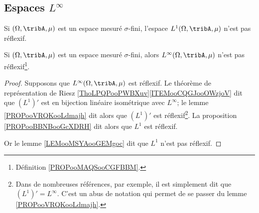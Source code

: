 \subsection{Espaces \texorpdfstring{\(  L^{\infty}\)}{Linfinity}}

\begin{lemma}        \label{LEMooMSYAooGEMgoc}
	Si \( (\Omega,\tribA,\mu)\) est un espace mesuré \( \sigma\)-fini, l'espace \( L^1(\Omega,\tribA,\mu)\) n'est pas réflexif.
\end{lemma}

\begin{lemma}     \label{LEMooUSXTooFvpsVd}
	Si \( (\Omega,\tribA,\mu)\) est un espace mesuré \( \sigma\)-fini, alors \( L^{\infty}(\Omega,\tribA,\mu)\) n'est pas réflexif\footnote{Définition \ref{PROPooMAQSooCGFBBM}.}.
\end{lemma}

\begin{proof}
	Supposons que \( L^{\infty}(\Omega,\tribA,\mu)\) est réflexif. Le théorème de représentation de Riesz \ref{ThoLPQPooPWBXuv}\ref{ITEMooCQGJooOWzjoV} dit que \( (L^1)'\) est en bijection linéaire isométrique avec \( L^{\infty}\); le lemme \ref{PROPooVRQKooLdmajh} dit alors que \( (L^1)'\) est réflexif\footnote{Dans de nombreuses références, par exemple\cite{BIBooFDGQooYferue}, il est simplement dit que \( (L^1)'=L^{\infty}\). C'est un abus de notation qui permet de se passer du lemme \ref{PROPooVRQKooLdmajh}.}. La proposition \ref{PROPooBBNBooGcXDRH} dit alors que \( L^1\) est réflexif.

	Or le lemme \ref{LEMooMSYAooGEMgoc} dit que \( L^1\) n'est pas réflexif.
\end{proof}

